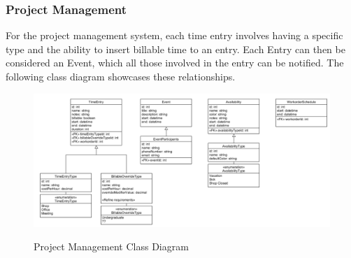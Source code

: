{{{{{{{{\subsubsection{Project Management}
For the project management system, each time entry involves having a specific type and the ability to insert billable time to an entry. Each Entry can then be considered an Event, which all those involved in the entry can be notified. The following class diagram showcases these relationships. 
\begin{figure}[H]
	\centering
	\includegraphics[width=5in]{project-management.png}\\
	\caption{Project Management Class Diagram}
	\label{fig:tobias}
\end{figure}

}}}}}}}}
